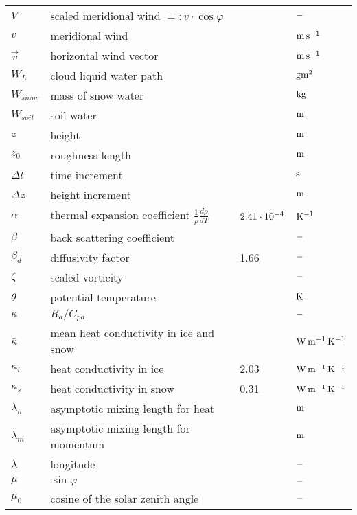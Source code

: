 \begin{tabular}{llll}
$V$       & scaled meridional wind $=:v\cdot\cos\varphi$    &         & $\rm -$ \\
$v$       & meridional wind                  &         & $\rm m\, s^{-1}$
\\
$\vec{v}$      & horizontal wind vector                &         & $\rm m\, s^{-1}$
\\
$W_L$     & cloud liquid water path     &    & $\rm g m^2$ \\
$W_{snow}$ & mass of snow water    &    & $\rm kg $\\
$W_{soil}$     & soil water             &    & $\rm  m $\\
$z$       & height                      &    & $\rm m$ \\
$z_0$          & roughness length            &    & $\rm m$ \\
$\Delta t $    & time increment              &    & $\rm s$ \\
 $\Delta z $   & height increment            &    &$\rm  m$ \\
$\alpha$  & thermal expansion coefficient $\frac{1}{\rho} \frac{d\rho}{dT}$ & $\rm
2.41\cdot 10^{-4}$ & $\rm K^{-1}$ \\
$\beta$   & back scattering coefficient &         &$\rm - $\\
$\beta_d$      & diffusivity factor          & 1.66    &$\rm - $ \\
$\zeta$   & scaled vorticity                      &         & $\rm -$ \\
$\theta$  & potential temperature            &         & $\rm K$ \\
$\kappa$  & $R_d/C_{pd}$                               &         & $\rm -$ \\
$\bar{\kappa}$      & mean heat conductivity in ice and snow     &         & $\rm W\,
m^{-1}\, K^{-1}$ \\
$\kappa_i$     & heat conductivity in ice              &  2.03   & $\rm W\, m^{-1}\,
K^{-1}$ \\
$\kappa_s$     & heat conductivity in snow             &  0.31   & $\rm W\,
m^{-1}\, K^{-1}$ \\

$\lambda_h$    & asymptotic mixing length for heat     &    &$\rm m $\\
$\lambda_m$    & asymptotic mixing length for momentum      &    &$\rm m $\\

$\lambda$      & longitude                                  &         & $\rm -$ \\

$\mu$          & $\sin\varphi$                              &         & $\rm -$ \\
$\mu_0$   & cosine of the solar zenith angle           &         & $\rm -$ \\ 


\end{tabular}
